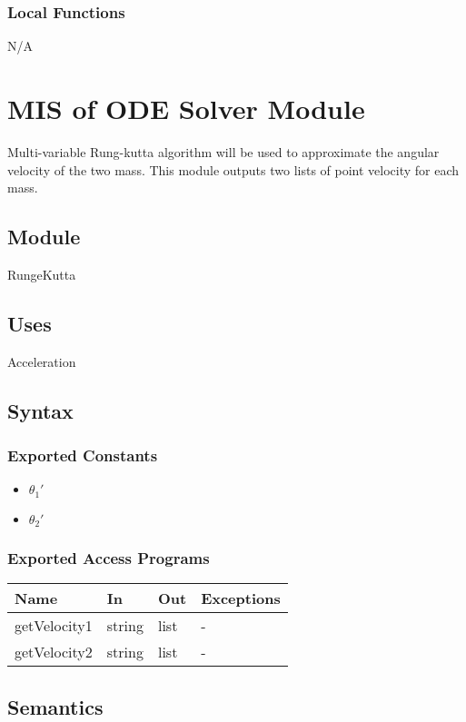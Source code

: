 \documentclass[12pt, titlepage]{article}
\begin{document}
\subsubsection{Local Functions}

N/A
\newpage
\section{MIS of ODE Solver Module} \label{ODEModule} 
Multi-variable Rung-kutta algorithm will be used to approximate the angular velocity of the two mass. \cite{RungeKutta} This module outputs two lists of point velocity for each mass. 
\subsection{Module}
RungeKutta
\subsection{Uses}
Acceleration

\subsection{Syntax}

\subsubsection{Exported Constants}
\begin{itemize}
  \item ${\theta_1}'$
  \item ${\theta_2}'$
\end{itemize}
\subsubsection{Exported Access Programs}

\begin{center}
\begin{tabular}{p{2cm} p{4cm} p{4cm} p{2cm}}
\hline
\textbf{Name} & \textbf{In} & \textbf{Out} & \textbf{Exceptions} \\
\hline
getVelocity1 & string & list & - \\
\hline
getVelocity2 & string & list & - \\
\hline
\end{tabular}
\end{center}

\subsection{Semantics}
\end{document}
